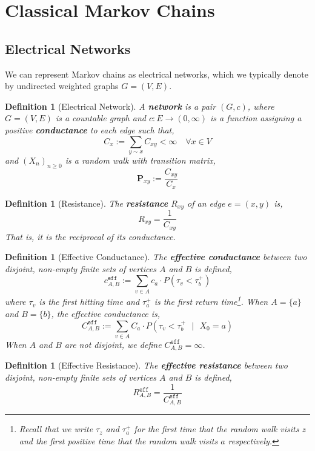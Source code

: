 \documentclass{tufte-handout}
\newtheorem{defn}[thm]{Definition}
\begin{document}
  \section{Classical Markov Chains}
  \subsection{Electrical Networks}
  We can represent Markov chains as electrical networks, which we typically denote by undirected weighted graphs $G = (V, E)$.

  \begin{defn}[Electrical Network]
    A \textbf{network} is a pair $(G, c)$, where $G = (V, E)$ is a countable graph and $c: E \rightarrow (0, \infty)$ is a function assigning a positive \textbf{conductance} to each edge such that,
    \[C_x := \sum_{y \sim x} C_{xy} < \infty \quad \forall x \in V\]
    \noindent and $(X_n)_{n \geq 0}$ is a random walk with transition matrix,
    \[\boldsymbol{P}_{xy} := \frac{C_{xy}}{C_x}\]
  \end{defn}

  \begin{defn}[Resistance]
    The \textbf{resistance} $R_{xy}$ of an edge $e = (x,y)$ is,
    \[R_{xy} = \frac{1}{C_{xy}}\]
    \noindent That is, it is the reciprocal of its conductance.
  \end{defn}

  \begin{defn}[Effective Conductance]
    The \textbf{effective conductance} between two disjoint, non-empty finite sets of vertices $A$ and $B$ is defined,
    \[c_{A,B}^{\texttt{eff}} := \sum_{v \in A} c_a \cdot P(\tau_{v} < \tau^+_b)\]
    \noindent where $\tau_v$ is the first hitting time and $\tau_a^+$ is the first return time\footnote{Recall that we write $\tau_z$ and $\tau^+_a$ for the first time that the random walk visits $z$ and the first positive time that the random walk visits $a$ respectively.}. When $A = \{a\}$ and $B = \{b\}$, the effective conductance is,
    \[C_{A,B}^{\texttt{eff}} := \sum_{v \in A} C_a \cdot P(\tau_{v} < \tau^+_b \text{ $|$ } X_0 = a)\]
    \noindent When $A$ and $B$ are not disjoint, we define $C_{A,B}^{\texttt{eff}} = \infty$.
  \end{defn}

  \begin{defn}[Effective Resistance]
    The \textbf{effective resistance} between two disjoint, non-empty finite sets of vertices $A$ and $B$ is defined,
    \[R_{A,B}^{\texttt{eff}} = \frac{1}{C_{A,B}^{\texttt{eff}}}\]
  \end{defn}
\end{document}
